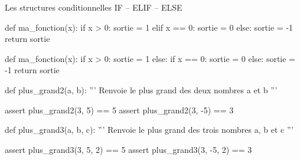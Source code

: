 \begin{easybox}{Les structures conditionnelles IF -- ELIF -- ELSE}{}
\begin{minipage}{0.38\linewidth}
		
	\begin{CodePythontexAlt}[TaillePolice=\normalsize, Largeur=1\linewidth,Centre,PremLigne=1, Lignes=true,]{}
			def ma_fonction(x):
				if x > 0:	
					sortie = 1
				elif x == 0:
					sortie = 0
				else:
					sortie = -1
				return sortie
			\end{CodePythontexAlt}
	
			\begin{CodePythontexAlt}[TaillePolice=\normalsize, Largeur=1\linewidth,Centre,PremLigne=1, Lignes=true,]{}
				def ma_fonction(x):
					if x > 0:	
						sortie = 1
					else:
						if x == 0:
							sortie = 0
						else:
							sortie = -1
					return sortie
				\end{CodePythontexAlt}
	\end{minipage}
	
	
	\end{easybox}
	
	\begin{exercice_cours}{}
	
        \begin{minipage}{0.48\linewidth}
            \begin{CodePythontexAlt}[TaillePolice=\normalsize, Largeur=1\linewidth,Centre,PremLigne=1, Lignes=true,]{}
def plus_grand2(a, b):
    ''' Renvoie le plus grand des 
    deux nombres a et b '''








assert plus_grand2(3, 5) == 5
assert plus_grand2(3, -5) == 3
	\end{CodePythontexAlt}
        \end{minipage}\hfill{}
        \begin{minipage}{0.48\linewidth}
            \begin{CodePythontexAlt}[TaillePolice=\normalsize, Largeur=1\linewidth,Centre,PremLigne=1, Lignes=true,]{}
def plus_grand3(a, b, c):
    ''' Renvoie le plus grand des 
    trois nombres a, b et c '''
        


	




assert plus_grand3(3, 5, 2) == 5
assert plus_grand3(3, -5, 2) == 3
		\end{CodePythontexAlt}
        \end{minipage}
        
	
	
	
		
	
	
	\end{exercice_cours}	
